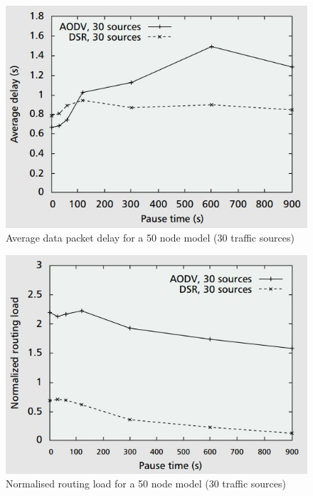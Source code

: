 \begin{figure}
\centering	
\includegraphics[scale=0.7]{img/comp2}
\caption{Average data packet delay for a 50 node model (30 traffic sources)\cite{perkins2001performance}}
\label{dsraodv2}
\end{figure}
		
\begin{figure}
\centering	
\includegraphics[scale=0.7]{img/comp3}
\caption{Normalised routing load for a 50 node model (30 traffic sources)\cite{perkins2001performance}}
\label{dsraodv3}
\end{figure}
	
